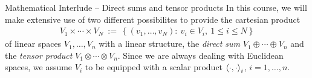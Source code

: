 \begin{subsection}{Mathematical Interlude -- Direct sums and tensor products}
 In this course, we will make extensive use of two different possibilites to provide the cartesian product 
 \begin{align*}
  V_1 \times \cdots \times V_N \ := \ \left\{ (v_1,\dots, v_N): \  v_i \in V_i, \ 1 \leq i \leq N \right\}
 \end{align*}
 of linear spaces $V_1,\dots, V_n$ with a linear structure, the \emph{direct sum} $V_1 \oplus \cdots \oplus V_n$ and the \emph{tensor product} $V_1 \otimes \cdots \otimes V_n$. Since we are always dealing with Euclidean
 spaces, we assume $V_i$ to be equipped with a scalar product $\braket{\cdot,\cdot}_i$, $i = 1,\dots, n$. 
 \end{subsection}
